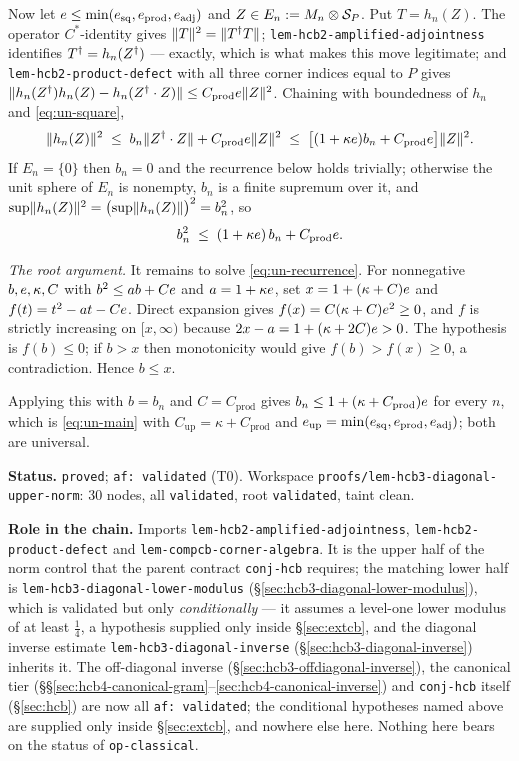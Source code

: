 Now let $e\le\min(e_{\mathrm{sq}},e_{\mathrm{prod}},e_{\mathrm{adj}})$ and
$Z\in E_n:=M_{n}\otimes \mathcal S_{P}$. Put $T=h_n(Z)$. The operator $C^*$-identity gives
$\lVert T\rVert^{2}=\lVert T^{\dagger} T\rVert$; \texttt{lem-hcb2-amplified-adjointness} identifies
$T^{\dagger}=h_n(Z^{\dagger})$ --- exactly, which is what makes this move legitimate; and
\texttt{lem-hcb2-product-defect} with all three corner indices equal to $P$ gives
$\lVert h_n(Z^{\dagger})h_n(Z)-h_n(Z^{\dagger}\mathbin{\cdot} Z)\rVert\le C_{\mathrm{prod}}e\lVert Z\rVert^{2}$. Chaining
with boundedness of $h_n$ and \eqref{eq:un-square},
\[
  \lVert h_n(Z)\rVert^{2}
  \;\le\;b_n\lVert Z^{\dagger}\mathbin{\cdot} Z\rVert+C_{\mathrm{prod}}e\lVert Z\rVert^{2}
  \;\le\;\bigl[(1+\kappa e)b_n+C_{\mathrm{prod}}e\bigr]\lVert Z\rVert^{2}.
\]
If $E_n=\{0\}$ then $b_n=0$ and the recurrence below holds trivially; otherwise the unit
sphere of $E_n$ is nonempty, $b_n$ is a finite supremum over it, and
$\sup\lVert h_n(Z)\rVert^{2}=\bigl(\sup\lVert h_n(Z)\rVert\bigr)^{2}=b_n^{2}$, so
\begin{equation}\label{eq:un-recurrence}
  b_n^{2}\;\le\;(1+\kappa e)\,b_n+C_{\mathrm{prod}}e .
\end{equation}

\emph{The root argument.} It remains to solve \eqref{eq:un-recurrence}. For nonnegative
$b,e,\kappa,C$ with $b^{2}\le ab+Ce$ and $a=1+\kappa e$, set
$x=1+(\kappa+C)e$ and $f(t)=t^{2}-at-Ce$. Direct expansion gives
$f(x)=C(\kappa+C)e^{2}\ge0$, and $f$ is strictly increasing on $[x,\infty)$ because
$2x-a=1+(\kappa+2C)e>0$. The hypothesis is $f(b)\le0$; if $b>x$ then monotonicity
would give $f(b)>f(x)\ge0$, a contradiction. Hence $b\le x$.

Applying this with $b=b_n$ and $C=C_{\mathrm{prod}}$ gives
$b_n\le1+(\kappa+C_{\mathrm{prod}})e$ for every $n$, which is \eqref{eq:un-main} with
$C_{\mathrm{up}}=\kappa+C_{\mathrm{prod}}$ and
$e_{\mathrm{up}}=\min(e_{\mathrm{sq}},e_{\mathrm{prod}},e_{\mathrm{adj}})$;
both are universal.

\medskip
\noindent\textbf{Status.} \texttt{proved}; \texttt{af: validated} (T0). Workspace
\texttt{proofs/lem-hcb3-diagonal-upper-norm}: 30 nodes, all \texttt{validated}, root
\texttt{validated}, taint clean.

\noindent\textbf{Role in the chain.} Imports
\texttt{lem-hcb2-amplified-adjointness},
\texttt{lem-hcb2-product-defect} and
\texttt{lem-compcb-corner-algebra}. It is the upper half of the norm control that the
parent contract \texttt{conj-hcb} requires; the matching lower half is
\texttt{lem-hcb3-diagonal-lower-modulus} (\S\ref{sec:hcb3-diagonal-lower-modulus}), which
is validated but only \emph{conditionally} --- it assumes a level-one lower modulus of at
least $\tfrac14$, a hypothesis supplied only inside \S\ref{sec:extcb}, and the diagonal
inverse estimate \texttt{lem-hcb3-diagonal-inverse}
(\S\ref{sec:hcb3-diagonal-inverse}) inherits it. The off-diagonal inverse
(\S\ref{sec:hcb3-offdiagonal-inverse}), the canonical tier
(\S\S\ref{sec:hcb4-canonical-gram}--\ref{sec:hcb4-canonical-inverse}) and
\texttt{conj-hcb} itself (\S\ref{sec:hcb}) are now all \texttt{af: validated}; the
conditional hypotheses named above are supplied only inside \S\ref{sec:extcb}, and
nowhere else here. Nothing here bears on the status of \texttt{op-classical}.

